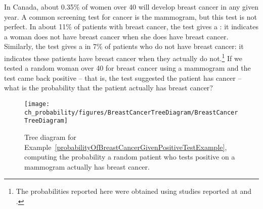 \begin{example}{In Canada, about 0.35\% of women over 40 will develop breast cancer in any given year. A common screening test for cancer is the mammogram, but this test is not perfect. In about 11\% of patients with breast cancer, the test gives a : it indicates a woman does not have breast cancer when she does have breast cancer. Similarly, the test gives a  in 7\% of patients who do not have breast cancer: it indicates these patients have breast cancer when they actually do not.\footnote{The probabilities reported here were obtained using studies reported at  and .} If we tested a random woman over 40 for breast cancer using a mammogram and the test came back positive -- that is, the test suggested the patient has cancer -- what is the probability that the patient actually has breast cancer?} 

\label{probabilityOfBreastCancerGivenPositiveTestExample}

\begin{figure}[h]
\centering
\texttt{[image: ch\_probability/figures/BreastCancerTreeDiagram/BreastCancerTreeDiagram]}
\caption{Tree diagram for Example~\ref{probabilityOfBreastCancerGivenPositiveTestExample}, computing the probability a random patient who tests positive on a mammogram actually has breast cancer.}
\label{BreastCancerTreeDiagram}
\end{figure}


\end{example}
